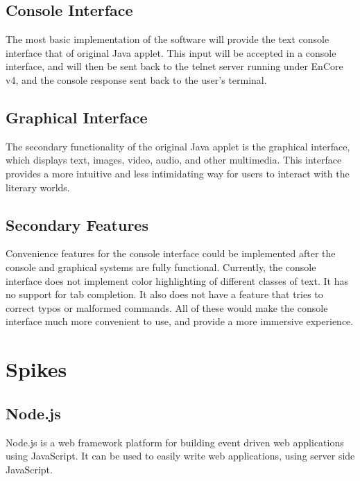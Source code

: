 \documentclass[12pt, letterpaper]{report}
\begin{document}
	\section{Console Interface}
	The most basic implementation of the software will provide the text console interface that of original Java applet. This input will be accepted in a console interface, and will then be sent back to the telnet server running under EnCore v4, and the console response sent back to the user's terminal.
	
	\section{Graphical Interface}
	The secondary functionality of the original Java applet is the graphical interface, which displays text, images, video, audio, and other multimedia. This interface provides a more intuitive and less intimidating way for users to interact with the literary worlds. 
	
	\section{Secondary Features}
	Convenience features for the console interface could be implemented after the console and graphical systems are fully functional. Currently, the console interface does not implement color highlighting of different classes of text. It has no support for tab completion. It also does not have a feature that tries to correct typos or malformed commands. All of these would make the console interface much more convenient to use, and provide a more immersive experience.	
	
	\chapter{Spikes}
	\section{Node.js}
	

	
	\par
	Node.js is a web framework platform for building event driven web applications using JavaScript. It can be used to easily write web applications, using server side JavaScript.
    	
\end{document}
